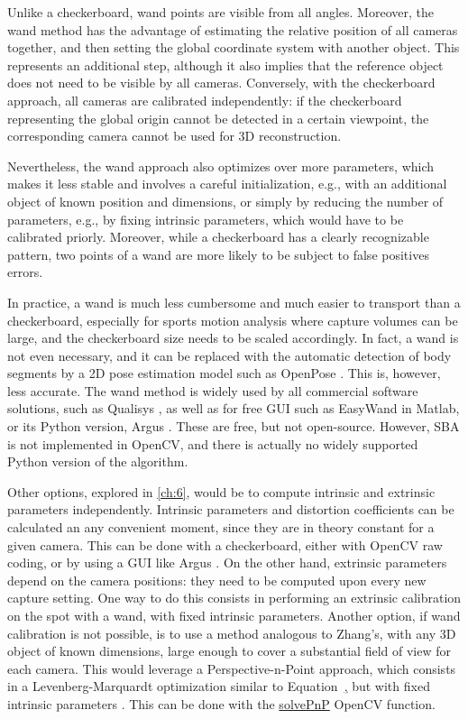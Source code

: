 Unlike a checkerboard, wand points are visible from all angles. Moreover, the wand method has the advantage of estimating the relative position of all cameras together, and then setting the global coordinate system with another object. This represents an additional step, although it also implies that the reference object does not need to be visible by all cameras. Conversely, with the checkerboard approach, all cameras are calibrated independently: if the checkerboard representing the global origin cannot be detected in a certain viewpoint, the corresponding camera cannot be used for 3D reconstruction. 

Nevertheless, the wand approach also optimizes over more parameters, which makes it less stable and involves a careful initialization, e.g., with an additional object of known position and dimensions, or simply by reducing the number of parameters, e.g., by fixing intrinsic parameters, which would have to be calibrated priorly. Moreover, while a checkerboard has a clearly recognizable pattern, two points of a wand are more likely to be subject to false positives errors.

In practice, a wand is much less cumbersome and much easier to transport than a checkerboard, especially for sports motion analysis where capture volumes can be large, and the checkerboard size needs to be scaled accordingly. In fact, a wand is not even necessary, and it can be replaced with the automatic detection of body segments by a 2D pose estimation model such as OpenPose \cite{Takahashi2018, Xu2021, Liu2022a}. This is, however, less accurate. The wand method is widely used by all commercial software solutions, such as Qualisys \cite{Qualisys}, as well as for free GUI such as EasyWand \cite{Theriault2014} in Matlab, or its Python version, Argus \cite{Argus,Jackson2016}. These are free, but not open-source. However, SBA is not implemented in OpenCV, and there is actually no widely supported Python version of the algorithm.

Other options, explored in \autoref{ch:6}, would be to compute intrinsic and extrinsic parameters independently. Intrinsic parameters and distortion coefficients can be calculated an any convenient moment, since they are in theory constant for a given camera. This can be done with a checkerboard, either with OpenCV raw coding, or by using a GUI like Argus \cite{Argus}. On the other hand, extrinsic parameters depend on the camera positions: they need to be computed upon every new capture setting. One way to do this consists in performing an extrinsic calibration on the spot with a wand, with fixed intrinsic parameters. Another option, if wand calibration is not possible, is to use a method analogous to Zhang's, with any 3D object of known dimensions, large enough to cover a substantial field of view for each camera. This would leverage a Perspective-n-Point approach, which consists in a Levenberg-Marquardt optimization similar to Equation~\href{eq:LM_algo}, but with fixed intrinsic parameters \cite{Marchand2015}. This can be done with the \href{https://docs.opencv.org/4.x/d9/d0c/group__calib3d.html#ga549c2075fac14829ff4a58bc931c033d}{solvePnP} OpenCV function. 



